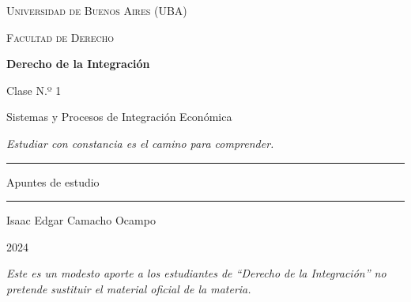 \documentclass[12pt,oneside]{book}
\newcommand{\universidad}{Universidad de Buenos Aires (UBA)}
\newcommand{\facultad}{Facultad de Derecho}
\newcommand{\materia}{Derecho de la Integración}
\newcommand{\titulo}{Sistemas y Procesos de Integración Económica}
\newcommand{\autor}{Isaac Edgar Camacho Ocampo}
\newcommand{\anio}{2024}
\begin{document}
\begin{titlepage}

\thispagestyle{empty}

\begin{center}

\vspace*{1cm}

{\large \textsc{\universidad}}

\vspace{0.2cm}

{\large \textsc{\facultad}}

\vspace{3cm}

{\Huge \textbf{\materia}}

\vspace{1cm}

{\Large Clase N.º 1}

\vspace{0.3cm}

{\LARGE \titulo}

\vspace{0.8cm}

\textit{Estudiar con constancia es el camino para comprender.}

\vspace{1.2cm}

\rule{0.70\textwidth}{0.5pt}

\vspace{0.5cm}

{\large Apuntes de estudio}

\vspace{0.5cm}

\rule{0.70\textwidth}{0.5pt}

\vfill

{\large \autor}

\vspace{0.3cm}

{\large \anio}

\end{center}

\vfill

\begin{flushleft}
\textit{Este es un modesto aporte a los estudiantes de ``Derecho de la Integración'' no pretende sustituir el material oficial de la materia.}
\end{flushleft}

\end{titlepage}
\end{document}
